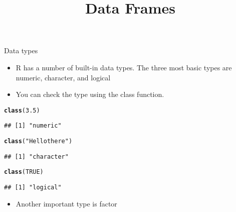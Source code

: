 \documentclass{beamer}\usepackage[]{graphicx}\usepackage[]{color}
\makeatletter
\newcommand{\hlnum}[1]{\textcolor[rgb]{0.686,0.059,0.569}{#1}}%
\newcommand{\hlstr}[1]{\textcolor[rgb]{0.192,0.494,0.8}{#1}}%
\newcommand{\hlstd}[1]{\textcolor[rgb]{0.345,0.345,0.345}{#1}}%
\newcommand{\hlkwd}[1]{\textcolor[rgb]{0.737,0.353,0.396}{\textbf{#1}}}%
\newenvironment{kframe}{%
 \def\at@end@of@kframe{}%
 \ifinner\ifhmode%
  \def\at@end@of@kframe{\end{minipage}}%
  \begin{minipage}{\columnwidth}%
 \fi\fi%
 \def\FrameCommand##1{\hskip\@totalleftmargin \hskip-\fboxsep
 \colorbox{shadecolor}{##1}\hskip-\fboxsep
     \hskip-\linewidth \hskip-\@totalleftmargin \hskip\columnwidth}%
 \MakeFramed {\advance\hsize-\width
   \@totalleftmargin\z@ \linewidth\hsize
   \@setminipage}}%
 {\par\unskip\endMakeFramed%
 \at@end@of@kframe}
\newenvironment{knitrout}{}{} %
\renewenvironment{knitrout}{\begin{singlespace}}{\end{singlespace}}
\theoremstyle{mystyle}
\makeatother
\begin{document}

\title{
Data Frames
}
\author{
}
\date{}

\begin{frame}[fragile]
\titlepage
\end{frame}

\begin{frame}[fragile]{Data types}
\begin{itemize}
\item R has a number of built-in data types.  The three most basic types are numeric, character, and logical 
\item You can check the type using the class function.
\end{itemize}
\begin{singlespace}
\begin{knitrout}
\color{fgcolor}\begin{kframe}
\begin{alltt}
\hlkwd{class}\hlstd{(}\hlnum{3.5}\hlstd{)}
\end{alltt}
\begin{verbatim}
## [1] "numeric"
\end{verbatim}
\begin{alltt}
\hlkwd{class}\hlstd{(}\hlstr{"Hello there"}\hlstd{)}
\end{alltt}
\begin{verbatim}
## [1] "character"
\end{verbatim}
\begin{alltt}
\hlkwd{class}\hlstd{(}\hlnum{TRUE}\hlstd{)}
\end{alltt}
\begin{verbatim}
## [1] "logical"
\end{verbatim}
\end{kframe}
\end{knitrout}
\end{singlespace}
\begin{itemize}
\item Another important type is factor
\end{itemize}
\end{frame}
\end{document}
